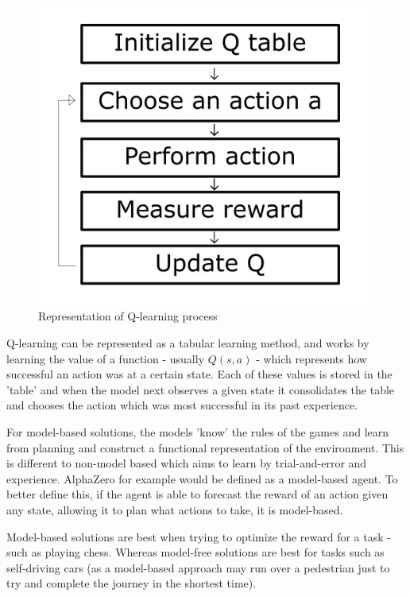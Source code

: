 \documentclass{article}
\begin{document}
    \begin{figure}
        \centering
        \includegraphics[scale=0.4]{qlearning.PNG}
        \caption{Representation of Q-learning process}
    \end{figure}
    Q-learning can be represented as a tabular learning method, and works by learning the value of a function - usually $Q(s, a)$ - which represents how successful an action was at
    a certain state. Each of these values is stored in the 'table' and when the model next observes a given state it consolidates the table and chooses the action which was most
    successful in its past experience.

    For model-based solutions, the models 'know' the rules of the games and learn from planning and construct a functional representation of the environment. This is different to non-model
    based which aims to learn by trial-and-error and experience. AlphaZero for example would be defined as a model-based agent. To better define this, if the agent is able to forecast the reward
    of an action given any state, allowing it to plan what actions to take, it is model-based.

    Model-based solutions are best when trying to optimize the reward for a task - such as playing chess. Whereas model-free solutions are best for tasks such as self-driving cars (as a model-based
    approach may run over a pedestrian just to try and complete the journey in the shortest time).
\end{document}
